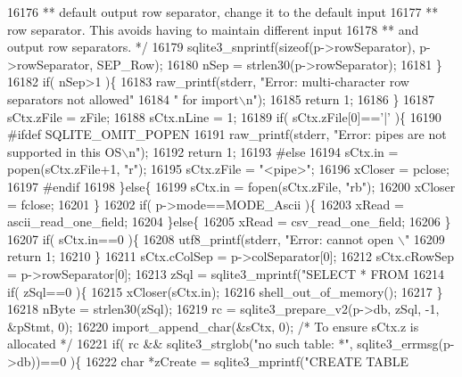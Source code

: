 \begin{DoxyCode}
{{{{{{{{{{{{{{{{{{{{{{{16176 \textcolor{comment}{      ** default output row separator, change it to the default input}
16177 \textcolor{comment}{      ** row separator.  This avoids having to maintain different input}
16178 \textcolor{comment}{      ** and output row separators. */}
16179       sqlite3_snprintf(\textcolor{keyword}{sizeof}(p->rowSeparator), p->rowSeparator, SEP_Row);
16180       nSep = strlen30(p->rowSeparator);
16181     \}
16182     \textcolor{keywordflow}{if}( nSep>1 )\{
16183       raw_printf(stderr, \textcolor{stringliteral}{"Error: multi-character row separators not allowed"}
16184                       \textcolor{stringliteral}{" for import\(\backslash\)n"});
16185       \textcolor{keywordflow}{return} 1;
16186     \}
16187     sCtx.zFile = zFile;
16188     sCtx.nLine = 1;
16189     \textcolor{keywordflow}{if}( sCtx.zFile[0]==\textcolor{charliteral}{'|'} )\{
16190 \textcolor{preprocessor}{#ifdef SQLITE\_OMIT\_POPEN}
16191       raw_printf(stderr, \textcolor{stringliteral}{"Error: pipes are not supported in this OS\(\backslash\)n"});
16192       \textcolor{keywordflow}{return} 1;
16193 \textcolor{preprocessor}{#else}
16194       sCtx.in = popen(sCtx.zFile+1, \textcolor{stringliteral}{"r"});
16195       sCtx.zFile = \textcolor{stringliteral}{"<pipe>"};
16196       xCloser = pclose;
16197 \textcolor{preprocessor}{#endif}
16198     \}\textcolor{keywordflow}{else}\{
16199       sCtx.in = fopen(sCtx.zFile, \textcolor{stringliteral}{"rb"});
16200       xCloser = fclose;
16201     \}
16202     \textcolor{keywordflow}{if}( p->mode==MODE_Ascii )\{
16203       xRead = ascii_read_one_field;
16204     \}\textcolor{keywordflow}{else}\{
16205       xRead = csv_read_one_field;
16206     \}
16207     \textcolor{keywordflow}{if}( sCtx.in==0 )\{
16208       utf8_printf(stderr, \textcolor{stringliteral}{"Error: cannot open \(\backslash\)"%
16209       \textcolor{keywordflow}{return} 1;
16210     \}
16211     sCtx.cColSep = p->colSeparator[0];
16212     sCtx.cRowSep = p->rowSeparator[0];
16213     zSql = sqlite3_mprintf(\textcolor{stringliteral}{"SELECT * FROM %
16214     \textcolor{keywordflow}{if}( zSql==0 )\{
16215       xCloser(sCtx.in);
16216       shell_out_of_memory();
16217     \}
16218     nByte = strlen30(zSql);
16219     rc = sqlite3_prepare_v2(p->db, zSql, -1, &pStmt, 0);
16220     import_append_char(&sCtx, 0);    \textcolor{comment}{/* To ensure sCtx.z is allocated */}
16221     \textcolor{keywordflow}{if}( rc && sqlite3_strglob(\textcolor{stringliteral}{"no such table: *"}, sqlite3_errmsg(p->db))==0 )\{
16222       \textcolor{keywordtype}{char} *zCreate = sqlite3_mprintf(\textcolor{stringliteral}{"CREATE TABLE %
}}}}}}}}}}}}}}}}}}}}}}}}}}
\end{DoxyCode}
